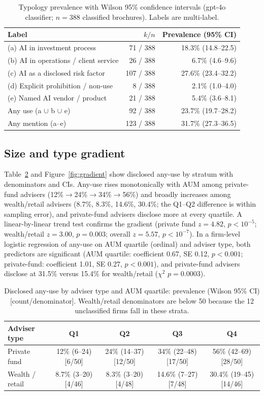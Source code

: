\documentclass[utf8]{FrontiersinHarvard} %
\begin{document}
\begin{table}[!ht]
\caption{Typology prevalence with Wilson 95\% confidence intervals (gpt-4o classifier; $n = 388$ classified brochures). Labels are multi-label.}
\label{tab:typology}
\centering
\begin{tabular}{lrr}
\toprule
Label & $k / n$ & Prevalence (95\% CI) \\
\midrule
(a) AI in investment process & 71 / 388 & 18.3\% (14.8--22.5) \\
(b) AI in operations / client service & 26 / 388 & 6.7\% (4.6--9.6) \\
(c) AI as a disclosed risk factor & 107 / 388 & 27.6\% (23.4--32.2) \\
(d) Explicit prohibition / non-use & 8 / 388 & 2.1\% (1.0--4.0) \\
(e) Named AI vendor / product & 21 / 388 & 5.4\% (3.6--8.1) \\
Any use (a $\cup$ b $\cup$ e) & 92 / 388 & 23.7\% (19.7--28.2) \\
Any mention (a--e) & 123 / 388 & 31.7\% (27.3--36.5) \\
\bottomrule
\end{tabular}
\end{table}

\subsection{Size and type gradient}
Table~\ref{tab:gradient} and Figure~\ref{fig:gradient} show disclosed any-use by stratum with denominators and CIs. Any-use rises monotonically with AUM among private-fund advisers (12\%$\rightarrow$24\%$\rightarrow$34\%$\rightarrow$56\%) and broadly increases among wealth/retail advisers (8.7\%, 8.3\%, 14.6\%, 30.4\%; the Q1--Q2 difference is within sampling error), and private-fund advisers disclose more at every quartile. A linear-by-linear trend test confirms the gradient (private fund $z = 4.82$, $p < 10^{-5}$; wealth/retail $z = 3.00$, $p = 0.003$; overall $z = 5.57$, $p < 10^{-7}$). In a firm-level logistic regression of any-use on AUM quartile (ordinal) and adviser type, both predictors are significant (AUM quartile: coefficient 0.67, SE 0.12, $p < 0.001$; private-fund: coefficient 1.01, SE 0.27, $p < 0.001$), and private-fund advisers disclose at 31.5\% versus 15.4\% for wealth/retail ($\chi^2$ $p = 0.0003$).

\begin{table}[!ht]
\caption{Disclosed any-use by adviser type and AUM quartile: prevalence (Wilson 95\% CI) [count/denominator]. Wealth/retail denominators are below 50 because the 12 unclassified firms fall in these strata.}
\label{tab:gradient}
\centering
\small
\begin{tabular}{lcccc}
\toprule
Adviser type & Q1 & Q2 & Q3 & Q4 \\
\midrule
Private fund & 12\% (6--24) [6/50] & 24\% (14--37) [12/50] & 34\% (22--48) [17/50] & 56\% (42--69) [28/50] \\
Wealth / retail & 8.7\% (3--20) [4/46] & 8.3\% (3--20) [4/48] & 14.6\% (7--27) [7/48] & 30.4\% (19--45) [14/46] \\
\bottomrule
\end{tabular}
\end{table}
\end{document}
